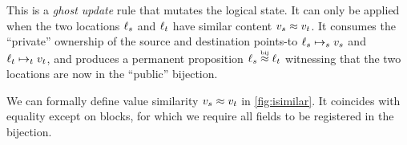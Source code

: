 \begin{mathline}
\end{mathline}
This is a \emph{ghost update} rule that mutates the logical state.
It can only be applied when the two locations $\datalangLoc_s$ and $\datalangLoc_t$ have similar content $\datalangVal_s \iSimilar \datalangVal_t$.
It consumes the ``private'' ownership of the source and destination points-to $\datalangLoc_s \iPointsto_s \datalangVal_s$ and $\datalangLoc_t \iPointsto_t \datalangVal_t$, and produces a permanent proposition $\datalangLoc_s \iInBij \datalangLoc_t$ witnessing that the two locations are now in the ``public'' bijection.

We can formally define value similarity $\datalangVal_s \iSimilar \datalangVal_t$ in \cref{fig:isimilar}.
It coincides with equality except on blocks, for which we require all fields to be registered in the bijection.



